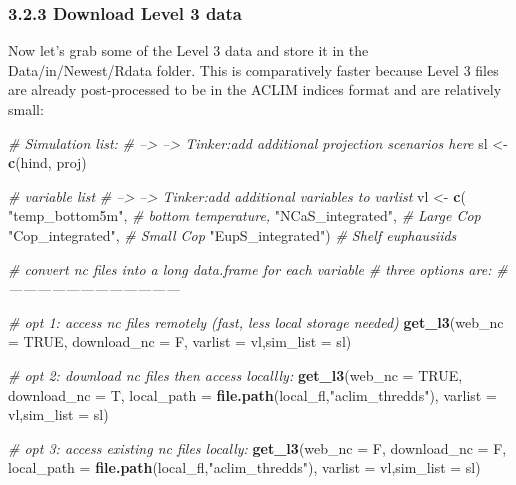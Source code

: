 \documentclass[
]{article}
\newenvironment{Shaded}{\begin{snugshade}}{\end{snugshade}}
\newcommand{\CommentTok}[1]{\textcolor[rgb]{0.56,0.35,0.01}{\textit{#1}}}
\newcommand{\DataTypeTok}[1]{\textcolor[rgb]{0.13,0.29,0.53}{#1}}
\newcommand{\KeywordTok}[1]{\textcolor[rgb]{0.13,0.29,0.53}{\textbf{#1}}}
\newcommand{\NormalTok}[1]{#1}
\newcommand{\OtherTok}[1]{\textcolor[rgb]{0.56,0.35,0.01}{#1}}
\newcommand{\StringTok}[1]{\textcolor[rgb]{0.31,0.60,0.02}{#1}}
\begin{document}
\hypertarget{download-level-3-data}{%
\subsubsection{3.2.3 Download Level 3
data}\label{download-level-3-data}}

Now let's grab some of the Level 3 data and store it in the
Data/in/Newest/Rdata folder. This is comparatively faster because Level
3 files are already post-processed to be in the ACLIM indices format and
are relatively small:

\begin{Shaded}
\begin{Highlighting}[]
    \CommentTok{# Simulation list:}
    \CommentTok{# --> --> Tinker:add additional projection scenarios here}
\NormalTok{    sl <-}\StringTok{ }\KeywordTok{c}\NormalTok{(hind, proj)}
    
    \CommentTok{# variable list}
    \CommentTok{# --> --> Tinker:add additional variables to varlist}
\NormalTok{    vl <-}\StringTok{ }\KeywordTok{c}\NormalTok{(}
              \StringTok{"temp_bottom5m"}\NormalTok{,    }\CommentTok{# bottom temperature,}
              \StringTok{"NCaS_integrated"}\NormalTok{,  }\CommentTok{# Large Cop}
              \StringTok{"Cop_integrated"}\NormalTok{,   }\CommentTok{# Small Cop}
              \StringTok{"EupS_integrated"}\NormalTok{)  }\CommentTok{# Shelf  euphausiids}
    
    \CommentTok{# convert  nc files into a long data.frame for each variable}
    \CommentTok{# three options are:}
    \CommentTok{# ------------------------------------}
    
    \CommentTok{# opt 1: access nc files remotely (fast, less local storage needed)}
    \KeywordTok{get_l3}\NormalTok{(}\DataTypeTok{web_nc =} \OtherTok{TRUE}\NormalTok{, }\DataTypeTok{download_nc =}\NormalTok{ F,}
          \DataTypeTok{varlist =}\NormalTok{ vl,}\DataTypeTok{sim_list =}\NormalTok{ sl)}
    
    \CommentTok{# opt 2:  download nc files then access locallly:}
    \KeywordTok{get_l3}\NormalTok{(}\DataTypeTok{web_nc =} \OtherTok{TRUE}\NormalTok{, }\DataTypeTok{download_nc =}\NormalTok{ T,}
          \DataTypeTok{local_path =} \KeywordTok{file.path}\NormalTok{(local_fl,}\StringTok{"aclim_thredds"}\NormalTok{),}
          \DataTypeTok{varlist =}\NormalTok{ vl,}\DataTypeTok{sim_list =}\NormalTok{ sl)}
    
     \CommentTok{# opt 3:  access existing nc files locally:}
    \KeywordTok{get_l3}\NormalTok{(}\DataTypeTok{web_nc =}\NormalTok{ F, }\DataTypeTok{download_nc =}\NormalTok{ F,}
          \DataTypeTok{local_path =} \KeywordTok{file.path}\NormalTok{(local_fl,}\StringTok{"aclim_thredds"}\NormalTok{),}
          \DataTypeTok{varlist =}\NormalTok{ vl,}\DataTypeTok{sim_list =}\NormalTok{ sl)}
\end{Highlighting}
\end{Shaded}
\end{document}

